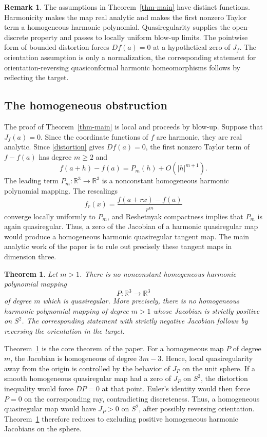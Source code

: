 \documentclass[10pt]{amsart}
\numberwithin{equation}{section}
\newtheorem{theorem}{Theorem}[section]
\theoremstyle{definition}
\newtheorem{remark}{Remark}[section]
\newcommand{\R}{\mathbb R}
\begin{document}
\begin{remark}
The assumptions in Theorem~\ref{thm-main} have distinct functions. Harmonicity
makes the map real analytic and makes the first nonzero Taylor term a
homogeneous harmonic polynomial. Quasiregularity supplies the open-discrete
property and passes to locally uniform blow-up limits. The pointwise form of
bounded distortion forces \(Df(a)=0\) at a hypothetical zero of \(J_f\). The
orientation assumption is only a normalization, the corresponding statement for
orientation-reversing quasiconformal harmonic homeomorphisms follows by
reflecting the target.
\end{remark}

\subsection{The homogeneous obstruction}

The proof of Theorem~\ref{thm-main} is local and proceeds by blow-up. Suppose
that \(J_f(a)=0\). Since the coordinate functions of \(f\) are harmonic, they
are real analytic. Since \eqref{distortion} gives \(Df(a)=0\), the first
nonzero Taylor term of \(f-f(a)\) has degree \(m\ge2\) and
\[
        f(a+h)-f(a)=P_m(h)+O(|h|^{m+1}).
\]
The leading term \(P_m:\R^3\to\R^3\) is a nonconstant homogeneous harmonic
polynomial mapping. The rescalings
\[
        f_r(x)=\frac{f(a+rx)-f(a)}{r^m}
\]
converge locally uniformly to \(P_m\), and Reshetnyak compactness implies that
\(P_m\) is again quasiregular. Thus, a zero of the Jacobian of a harmonic
quasiregular map would produce a homogeneous harmonic quasiregular tangent
map. The main analytic work of the paper is to rule out precisely these
tangent maps in dimension three.

\begin{theorem}
\label{thm-homogeneous-qr-obstruction}
Let \(m>1\). There is no nonconstant homogeneous harmonic polynomial mapping
\[
        P:\R^3\to\R^3
\]
of degree \(m\) which is quasiregular. More precisely, there is no homogeneous
harmonic polynomial mapping of degree \(m>1\) whose Jacobian is strictly
positive on \(S^2\). The corresponding statement with strictly negative
Jacobian follows by reversing the orientation in the target.
\end{theorem}

Theorem~\ref{thm-homogeneous-qr-obstruction} is the core theorem of the
paper. For a homogeneous map \(P\) of degree \(m\), the Jacobian is homogeneous
of degree \(3m-3\). Hence, local quasiregularity away from the origin is
controlled by the behavior of \(J_P\) on the unit sphere. If a smooth
homogeneous quasiregular map had a zero of \(J_P\) on \(S^2\), the distortion
inequality would force \(DP=0\) at that point. Euler's identity would then
force \(P=0\) on the corresponding ray, contradicting discreteness. Thus, a
homogeneous quasiregular map would have \(J_P>0\) on \(S^2\), after possibly
reversing orientation. Theorem~\ref{thm-homogeneous-qr-obstruction} therefore
reduces to excluding positive homogeneous harmonic Jacobians on the sphere.
\end{document}
